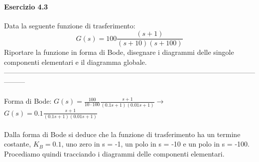 \documentclass[12pt,a4paper]{article}
\begin{document}
	\paragraph{Esercizio 4.3} Data la seguente funzione di trasferimento:
	\[
	G(s) = 100\frac{(s+1)}{(s+10)(s+100)}
	\]
	Riportare la funzione in forma di Bode, disegnare i diagrammi delle singole componenti elementari e il diagramma globale.\\
	---------------------------------------------------------------------------------------------------------------------\\ \\
	Forma di Bode: \quad$G(s) = \frac{100}{10 \cdot 100}\frac{s+1}{\left(0.1s+1\right)\left(0.01s+1\right)}$\quad$\rightarrow$\quad$G(s) = 0.1\frac{s+1}{\left(0.1s+1\right)\left(0.01s+1\right)}$\\\\
	Dalla forma di Bode si deduce che la funzione di trasferimento ha un termine costante, $K_B = 0.1$, uno zero in s = -1, un polo in s = -10 e un polo in s = -100.\\Procediamo quindi tracciando i diagrammi delle componenti elementari.\\
\end{document}
